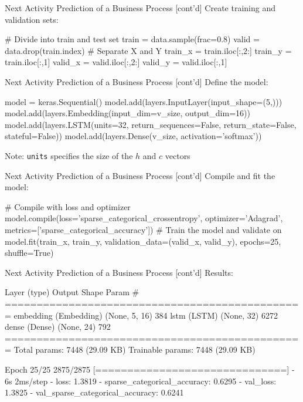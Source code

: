 \documentclass[ignorenonframetext,xcolor=x11names]{beamer}
\begin{document}
\begin{frame}[fragile]{Next Activity Prediction of a Business Process \small [cont'd]}
Create training and validation sets:
\begin{pythoncode}
# Divide into train and test set
train = data.sample(frac=0.8)
valid = data.drop(train.index)
# Separate X and Y
train_x = train.iloc[:,2:]
train_y = train.iloc[:,1]
valid_x = valid.iloc[:,2:]
valid_y = valid.iloc[:,1]
\end{pythoncode}
\end{frame}


\begin{frame}[fragile]{Next Activity Prediction of a Business Process \small [cont'd]}
Define the model:
\begin{pythoncode}
model = keras.Sequential()
model.add(layers.InputLayer(input_shape=(5,)))
model.add(layers.Embedding(input_dim=v_size,
                           output_dim=16))
model.add(layers.LSTM(units=32,
                      return_sequences=False,
                      return_state=False,
                      stateful=False))
model.add(layers.Dense(v_size, activation='softmax'))
\end{pythoncode}
Note: \texttt{units} specifies the size of the $h$ and $c$ vectors
\end{frame}

\begin{frame}[fragile]{Next Activity Prediction of a Business Process \small [cont'd]}
Compile and fit the model:
\begin{pythoncode}
# Compile with loss and optimizer
model.compile(loss='sparse_categorical_crossentropy',
              optimizer='Adagrad',
              metrics=['sparse_categorical_accuracy'])
# Train the model and validate on
model.fit(train_x, train_y,
          validation_data=(valid_x, valid_y),
          epochs=25, shuffle=True)
\end{pythoncode}
\end{frame}

\begin{frame}[fragile]{Next Activity Prediction of a Business Process \small [cont'd]}
Results:
\begin{textcode}
 Layer (type)           Output Shape    Param #   
===============================================
 embedding (Embedding)  (None, 5, 16)   384       
 lstm (LSTM)            (None, 32)      6272      
 dense (Dense)          (None, 24)      792                                                                        
===============================================
Total params: 7448 (29.09 KB)
Trainable params: 7448 (29.09 KB)

Epoch 25/25
2875/2875 [==============================] - 6s 2ms/step 
- loss: 1.3819 - sparse_categorical_accuracy: 0.6295 
- val_loss: 1.3825 - val_sparse_categorical_accuracy: 0.6241
\end{textcode}
\end{frame}
\end{document}
